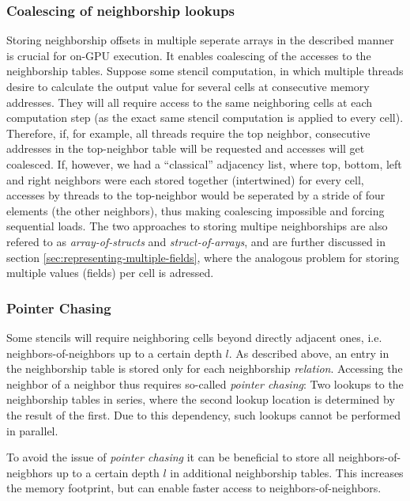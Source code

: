 \subsubsection{Coalescing of neighborship lookups}

Storing neighborship offsets in multiple seperate arrays in the described manner is crucial for on-GPU execution. It enables coalescing of the accesses to the neighborship tables. Suppose some stencil computation, in which multiple threads desire to calculate the output value for several cells at consecutive memory addresses. They will all require access to the same neighboring cells at each computation step (as the exact same stencil computation is applied to every cell). Therefore, if, for example, all threads require the top neighbor, consecutive addresses in the top-neighbor table will be requested and accesses will get coalesced. If, however, we had a ``classical'' adjacency list, where top, bottom, left and right neighbors were each stored together (intertwined) for every cell, accesses by threads to the top-neighbor would be seperated by a stride of four elements (the other neighbors), thus making coalescing impossible and forcing sequential loads. The two approaches to storing multipe neighborships are also refered to as \emph{array-of-structs} and \emph{struct-of-arrays}, and are further discussed in section \ref{sec:representing-multiple-fields}, where the analogous problem for storing multiple values (fields) per cell is adressed.

\subsubsection{Pointer Chasing}

Some stencils will require neighboring cells beyond directly adjacent ones, i.e. neighbors-of-neighbors up to a certain depth $l$. As described above, an entry in the neighborship table is stored only for each neighborship \emph{relation}. Accessing the neighbor of a neighbor thus requires so-called \emph{pointer chasing}: Two lookups to the neighborship tables in series, where the second lookup location is determined by the result of the first. Due to this dependency, such lookups cannot be performed in parallel.

To avoid the issue of \emph{pointer chasing} it can be beneficial to store all neighbors-of-neigbhors up to a certain depth $l$ in additional neighborship tables. This increases the memory footprint, but can enable faster access to neighbors-of-neighbors.

